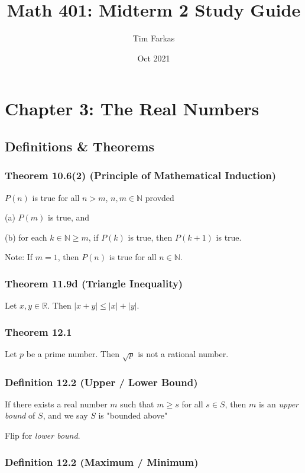 \documentclass{book}
\title{Math 401: Midterm 2 Study Guide}
\author{Tim Farkas}
\date{Oct 2021}
\begin{document}
\maketitle

\chapter*{Chapter 3: The Real Numbers}

\section*{Definitions \& Theorems}

\subsection*{Theorem 10.6(2) (Principle of Mathematical Induction)}

$P(n)$ is true for all $n > m$, $n, m \in \mathbb{N}$ provded 

(a) $P(m)$ is true, and 

(b) for each $k \in \mathbb{N} \geq m$, if $P(k)$ is true, then $P(k+1)$ is true. 

Note: If $m = 1$, then $P(n)$ is true for all $n \in \mathbb{N}$. 

\subsection*{Theorem 11.9d (Triangle Inequality)}

Let $x, y \in \mathbb{R}$. Then $\left|x + y\right| \leq |x| + |y|$. 

\subsection*{Theorem 12.1}

Let $p$ be a prime number. Then $\sqrt{p}$ is not a rational number. 

\subsection*{Definition 12.2 (Upper / Lower Bound)}

If there exists a real number $m$ such that $m \geq s$ for all $s \in S$, then $m$ is an \emph{upper bound} of $S$, and we say $S$ is "bounded above"

Flip for \emph{lower bound}. 

\subsection*{Definition 12.2 (Maximum / Minimum)}
\end{document}
